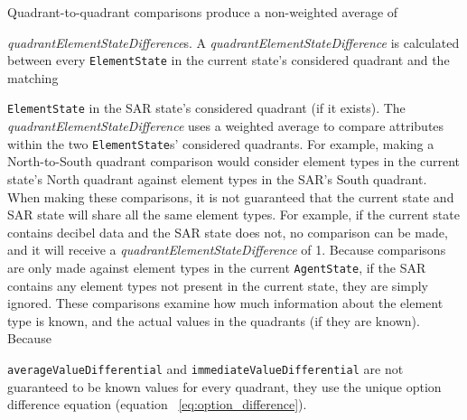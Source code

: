 Quadrant-to-quadrant comparisons produce a non-weighted average of

\noindent
\textit{quadrantElementStateDifference}s.
A \textit{quadrantElementStateDifference} is calculated between every \texttt{ElementState} in the current state's considered quadrant and the matching

\noindent
\texttt{ElementState} in the SAR state's considered quadrant (if it exists).
The \textit{quadrantElementStateDifference} uses a weighted average to compare attributes within the two \texttt{ElementState}s' considered quadrants.
For example, making a North-to-South quadrant comparison would consider element types in the current state's North quadrant against element types in the SAR's South quadrant.
When making these comparisons, it is not guaranteed that the current state and SAR state will share all the same element types.
For example, if the current state contains decibel data and the SAR state does not, no comparison can be made, and it will receive a \textit{quadrantElementStateDifference} of 1.
Because comparisons are only made against element types in the current \texttt{AgentState}, if the SAR contains any element types not present in the current state, they are simply ignored.
These comparisons examine how much information about the element type is known, and the actual values in the quadrants (if they are known).
Because

\noindent
\texttt{averageValueDifferential} and \texttt{immediateValueDifferential} are not guaranteed to be known values for every quadrant, they use the unique option difference equation (equation ~\ref{eq:option_difference}).


